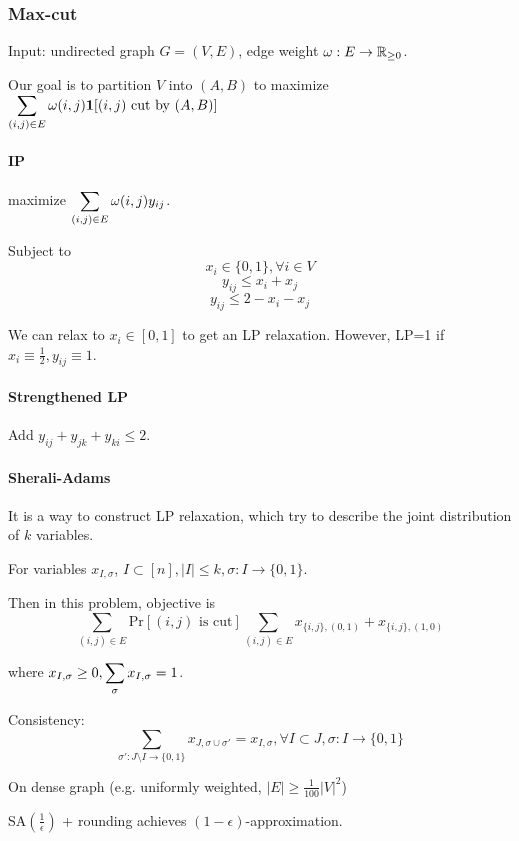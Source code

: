 \subsubsection{Max-cut}
\begin{example}
    Input: undirected graph  $ G=(V,E) $, edge weight  $ \omega:E\rightarrow\mathbb R_{ \geq 0} $.
    
    Our goal is to partition  $ V  $ into  $ (A,B)  $ to maximize  $ \displaystyle\sum_{(i,j)\in E}\omega(i,j)\mathbf{1}[(i,j)\text{ cut by }(A,B)] $ 
\end{example}
\paragraph{IP} maximize  $ \displaystyle\sum_{(i,j)\in E}\omega(i,j)y_{ij} $.\

Subject to  \[x_i\in \{0,1\}, \forall i\in V \]
\[y_{ij} \leq x_i+x_j\]
\[y_{ij} \leq 2-x_i-x_j\]

We can relax to  $ x_i\in [0,1] $ to get an LP relaxation. However, LP=1 if  $ x_i\equiv \frac{1}{2},y_{ij}\equiv 1 $. 

\paragraph{Strengthened LP} Add  $ y_{ij}+y_{jk}+y_{ki} \leq 2 $.

\paragraph{Sherali-Adams} It is a way to construct LP relaxation, which try to  describe the joint distribution of  $ k $ variables. 

For variables  $ x_{I,\sigma} $,  $ I\subset [n],|I| \leq k,\sigma:I\rightarrow\{0,1\} $.

Then in this problem, objective is 
\[\sum_{(i,j)\in E}\mathrm{Pr}[(i,j)\text{ is cut}]\sum_{(i,j)\in E}x_{\{i,j\},(0,1)}+x_{\{i,j\},(1,0)}\]

where  $ x_{I,\sigma} \geq 0,\displaystyle\sum_{\sigma}x_{I,\sigma}=1 $.

Consistency: 
\[\sum_{\sigma':J\setminus I\rightarrow \{0,1\}}x_{J,\sigma\cup \sigma'}=x_{I,\sigma},\forall I\subset J,\sigma:I\rightarrow \{0,1\}\]

\begin{theorem}
    On dense graph (e.g. uniformly weighted,  $ |E| \geq \frac{1}{100}|V|^2 $)

    SA$ (\frac{1}{\epsilon}) $ + rounding achieves  $ (1-\epsilon) $-approximation. 
\end{theorem}

